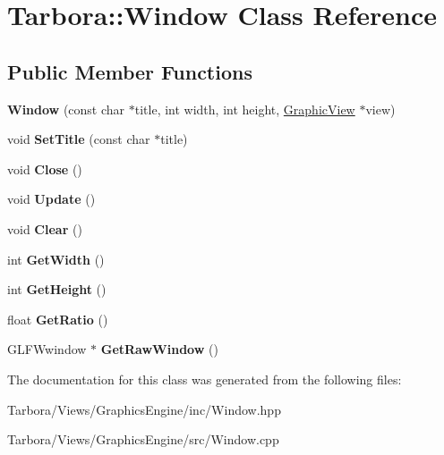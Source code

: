\hypertarget{classTarbora_1_1Window}{}\section{Tarbora\+:\+:Window Class Reference}
\label{classTarbora_1_1Window}
\subsection*{Public Member Functions}
\begin{DoxyCompactItemize}
\item 
\mbox{\label{classTarbora_1_1Window_ad37c35901d032a4f878c4432a02b1cf8}} 
{\bfseries Window} (const char $\ast$title, int width, int height, \hyperlink{classTarbora_1_1GraphicView}{Graphic\+View} $\ast$view)
\item 
\mbox{\label{classTarbora_1_1Window_a7a937281939b010abfcf4ee3b5af7965}} 
void {\bfseries Set\+Title} (const char $\ast$title)
\item 
\mbox{\label{classTarbora_1_1Window_a4364444d692f3987cad5dd7af2ef500c}} 
void {\bfseries Close} ()
\item 
\mbox{\label{classTarbora_1_1Window_ad5a3c70ba1dae1504632c0c5c1c4400c}} 
void {\bfseries Update} ()
\item 
\mbox{\label{classTarbora_1_1Window_ac421916de237342ac7bd76ca93b7bb66}} 
void {\bfseries Clear} ()
\item 
\mbox{\label{classTarbora_1_1Window_a63cfffc2853e2ccc3b98e1321d87380f}} 
int {\bfseries Get\+Width} ()
\item 
\mbox{\label{classTarbora_1_1Window_a96caf5673282b3b36025d978483171b4}} 
int {\bfseries Get\+Height} ()
\item 
\mbox{\label{classTarbora_1_1Window_a8793c64c13ae101011895dd7b0aabc54}} 
float {\bfseries Get\+Ratio} ()
\item 
\mbox{\label{classTarbora_1_1Window_a184b2465651ced28b68d71239d66b51a}} 
G\+L\+F\+Wwindow $\ast$ {\bfseries Get\+Raw\+Window} ()
\end{DoxyCompactItemize}


The documentation for this class was generated from the following files\+:\begin{DoxyCompactItemize}
\item 
Tarbora/\+Views/\+Graphics\+Engine/inc/Window.\+hpp\item 
Tarbora/\+Views/\+Graphics\+Engine/src/Window.\+cpp\end{DoxyCompactItemize}
